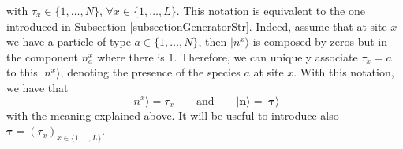 \documentclass[10pt]{article}
\numberwithin{equation}{section}
\numberwithin{equation}{subsection}
\begin{document}
with $\tau_{x}\in \{1,\ldots,N\}$, $\forall x\in \{1,\ldots,L\}$. This notation is equivalent to the one introduced in Subsection \ref{subsectionGeneratorStr}. Indeed, assume that at site $x$ we have a particle of type $a\in\{1,\ldots,N\} $, then $|n^{x}\rangle$ is composed by zeros but in the component $n_{a}^{x}$ where there is $1$. Therefore, we can uniquely associate  $\tau_{x}=a$ to this $|n^{x}\rangle$, denoting the presence of the species $a$ at site $x$. With this notation, we have that 
\begin{equation}\label{notation}
	|n^{x}\rangle =\tau_{x}\qquad \text{and}\qquad|\bm{n}\rangle=|\bm{\tau}\rangle
\end{equation}
with the meaning explained above. It will be useful to introduce also $\bm{\tau}=(\tau_{x})_{x\in \{1,\ldots,L\}}$. 

\end{document}
